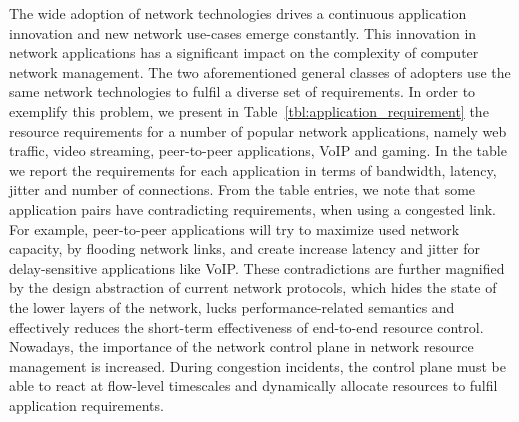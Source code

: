 
The wide adoption of network technologies drives a continuous application
innovation and new network use-cases emerge constantly.  This innovation in
network applications has a significant impact on the complexity of computer
network management.  The two aforementioned general classes of adopters use the
same network technologies to fulfil a diverse set of requirements.  In order to
exemplify this problem, we present in Table~\ref{tbl:application_requirement}
the resource requirements for a number of popular network applications, namely
web traffic, video streaming, peer-to-peer applications,  VoIP and
gaming. In the table we report the requirements for each
application in terms of bandwidth, latency, jitter and number of connections.
From the table entries, we note that some application pairs have contradicting
requirements, when using a congested link.  For example, peer-to-peer
applications will try to maximize used network capacity, by flooding network
links, and create increase latency and jitter for delay-sensitive
applications like VoIP\@.  These contradictions are further magnified by the
design abstraction of current network protocols, which hides the state of the
lower layers of the network, lucks performance-related semantics and effectively
reduces the short-term effectiveness of end-to-end resource control.  Nowadays,
the importance of the network control plane in network resource management is
increased. During congestion incidents, the control plane must be able to react
at flow-level timescales and dynamically allocate resources to fulfil
application requirements. 


